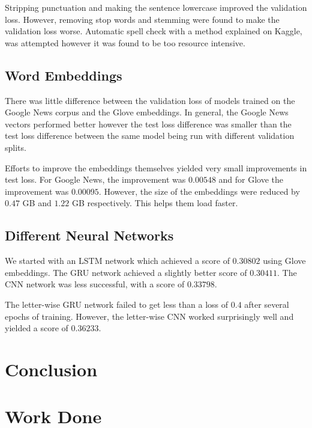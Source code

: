 \documentclass{article}
\begin{document}
Stripping punctuation and making the sentence lowercase improved the validation loss. However, removing stop words and stemming were found to make the validation loss worse. Automatic spell check with a method explained on Kaggle, was attempted however it was found to be too resource intensive.

\subsection{Word Embeddings}

There was little difference between the validation loss of models trained on the Google News corpus and the Glove embeddings. In general, the Google News vectors performed better however the test loss difference was smaller than the test loss difference between the same model being run with different validation splits.

Efforts to improve the embeddings themselves yielded very small improvements in test loss. For Google News, the improvement was $0.00548$ and for Glove the improvement was $0.00095$. However, the size of the embeddings were reduced by $0.47$ GB and $1.22$ GB respectively. This helps them load faster.

\subsection{Different Neural Networks}

We started with an LSTM network which achieved a score of $0.30802$ using Glove embeddings. The GRU network achieved a slightly better score of $0.30411$. The CNN network was less successful, with a score of $0.33798$.

The letter-wise GRU network failed to get less than a loss of $0.4$ after several epochs of training. However, the letter-wise CNN worked surprisingly well and yielded a score of $0.36233$.

\section{Conclusion}

\appendix
\section{Work Done}
\end{document}
